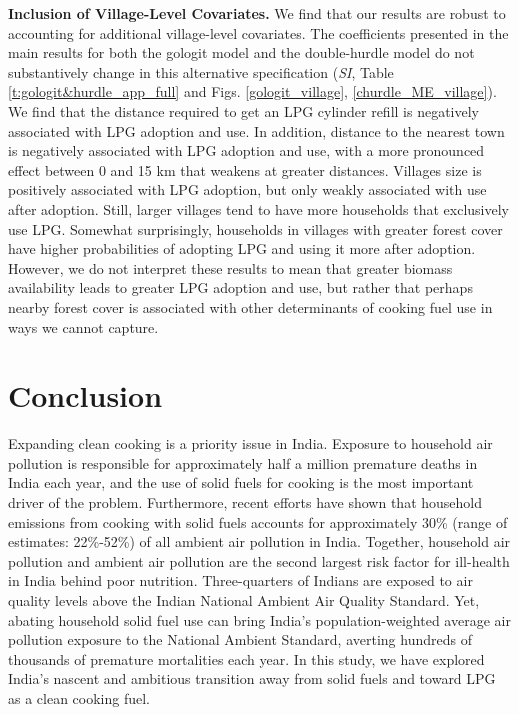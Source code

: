 \documentclass[11pt,english]{article}
\theoremstyle{plain} \newtheorem{claim}{Claim}
\theoremstyle{plain} \newtheorem{prop}{Proposition}
\theoremstyle{plain} \newtheorem{hypo}{Hypothesis}
\begin{document}
\textbf{Inclusion of Village-Level Covariates.} We find that our results are robust to accounting for additional village-level covariates. The coefficients presented in the main results for both the gologit model and the double-hurdle model do not substantively change in this alternative specification (\textit{SI}, Table \ref{t:gologit&hurdle_app_full} and Figs. \ref{gologit_village}, \ref{churdle_ME_village}). We find that the distance required to get an LPG cylinder refill is negatively associated with LPG adoption and use. In addition, distance to the nearest town is negatively associated with LPG adoption and use, with a more pronounced effect between 0 and 15 km that weakens at greater distances. Villages size is positively associated with LPG adoption, but only weakly associated with use after adoption. Still, larger villages tend to have more households that exclusively use LPG. Somewhat surprisingly, households in villages with greater forest cover have higher probabilities of adopting LPG and using it more after adoption. However, we do not interpret these results to mean that greater biomass availability leads to greater LPG adoption and use, but rather that perhaps nearby forest cover is associated with other determinants of cooking fuel use in ways we cannot capture.


\section*{Conclusion}

Expanding clean cooking is a priority issue in India. Exposure to household air pollution is responsible for approximately half a million premature deaths in India each year, and the use of solid fuels for cooking is the most important driver of the problem. Furthermore, recent efforts have shown that household emissions from cooking with solid fuels accounts for approximately 30\% (range of estimates: 22\%-52\%) of all ambient air pollution in India\citep{Chowdhuryetal2019a}. Together, household air pollution and ambient air pollution are the second largest risk factor for ill-health in India behind poor nutrition\citep{Dandonaetal2017}. Three-quarters of Indians are exposed to air quality levels above the Indian National Ambient Air Quality Standard\citep{Balakrishnanetal2019}. Yet, abating household solid fuel use can bring India's population-weighted average air pollution exposure to the National Ambient Standard, averting hundreds of thousands of premature mortalities each year\citep{Chowdhuryetal2019b}. In this study, we have explored India's nascent and ambitious transition away from solid fuels and toward LPG as a clean cooking fuel.
\end{document}
